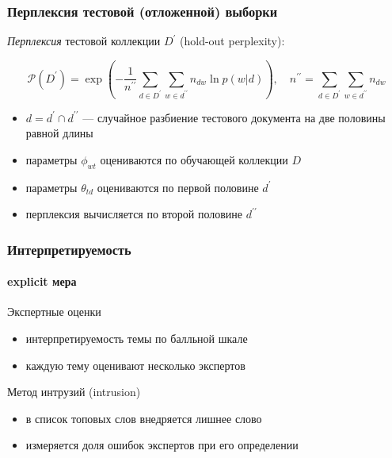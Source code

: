 \documentclass[fullscreen=true, bookmarks=true, hyperref={pdfencoding=unicode}]{beamer}
\begin{document}
\begin{frame}
  \frametitle{Перплексия тестовой (отложенной) выборки}

  {\it Перплексия} тестовой коллекции $D^\prime$ (hold-out perplexity):

  $$ \mathcal{P} (D^\prime) = \exp\left(-\frac{1}{n^{\prime\prime}} \sum\limits_{d \in D^{\prime}} \sum\limits_{w \in d^{\prime\prime}} n_{dw} \ln p(w|d) \right),
     \quad n^{\prime\prime} = \sum\limits_{d \in D^{\prime}}\sum\limits_{w \in d^{\prime\prime}} n_{dw}$$

  \begin{itemize}
    \item $d = d^{\prime}\cap d^{\prime\prime}$ — случайное разбиение тестового документа на две половины равной длины
    \item параметры $\phi_{wt}$ оцениваются по обучающей коллекции $D$
    \item параметры $\theta_{td}$ оцениваются по первой половине $d^\prime$
    \item перплексия вычисляется по второй половине $d^{\prime\prime}$
  \end{itemize}
\end{frame}


\begin{frame}
  \frametitle{Интерпретируемость}
  \framesubtitle{explicit мера}

  Экспертные оценки
  \begin{itemize}
    \item интерпретируемость темы по балльной шкале
    \item каждую тему оценивают несколько экспертов
  \end{itemize}
  \vspace{1cm}
  Метод интрузий (intrusion)
  \begin{itemize}
    \item в список топовых слов внедряется лишнее слово
    \item измеряется доля ошибок экспертов при его определении
  \end{itemize}

\end{frame}
\end{document}
